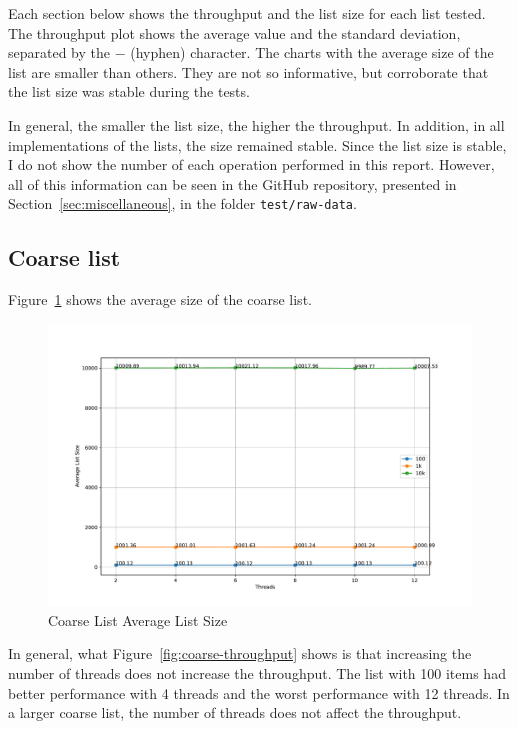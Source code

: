 \documentclass{article}
\begin{document}
Each section below shows the throughput and the list size for each list tested. The throughput plot shows the average value and the standard deviation, separated by the $-$ (hyphen) character. The charts with the average size of the list are smaller than others. They are not so informative, but corroborate that the list size was stable during the tests.

In general, the smaller the list size, the higher the throughput. In addition, in all implementations of the lists, the size remained stable. Since the list size is stable, I do not show the number of each operation performed in this report. However, all of this information can be seen in the GitHub repository, presented in Section~\ref{sec:miscellaneous}, in the folder \texttt{test/raw-data}.

\subsection{Coarse list}

Figure~\ref{fig:coarse-size} shows the average size of the coarse list.

\begin{figure}[H]
    \centering
    \includegraphics[scale=0.3]{../test/plots/CoarseListAverageListSize.pdf}
    \caption{Coarse List Average List Size}
    \label{fig:coarse-size}
\end{figure}

In general, what Figure~\ref{fig:coarse-throughput} shows is that increasing the number of threads does not increase the throughput. The list with 100 items had better performance with 4 threads and the worst performance with 12 threads. In a larger coarse list, the number of threads does not affect the throughput.
\end{document}
